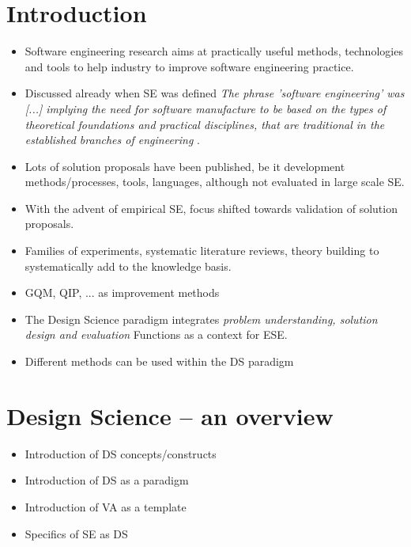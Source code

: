 \documentclass[graybox]{svmult}
\begin{document}
\section{Introduction}
\label{sec:intro}

\begin{itemize}
\item Software engineering research aims at practically useful methods, technologies and tools to help industry to improve software engineering practice. 
\item Discussed already when SE was defined \emph{The phrase 'software engineering' was [...] implying the need for software manufacture to be based on the types of theoretical foundations and practical disciplines, that are traditional in the established branches of engineering} \cite[p13]{Nato1968}.
\item Lots of solution proposals have been published, be it development methods/processes, tools, languages, although not evaluated in large scale SE.
\item With the advent of empirical SE, focus shifted towards validation of solution proposals. 
\item Families of experiments, systematic literature reviews, theory building to systematically add to the knowledge basis.
\item GQM, QIP, ... as improvement methods
\item The Design Science paradigm integrates \emph{problem understanding, solution design and evaluation} Functions as a context for ESE.
\item Different methods can be used within the DS paradigm
\end{itemize}

\section{Design Science -- an overview}
\begin{itemize}
\item Introduction of DS concepts/constructs
\item Introduction of DS as a paradigm
\item Introduction of VA as a template
\item Specifics of SE as DS
\end{itemize}
\end{document}
